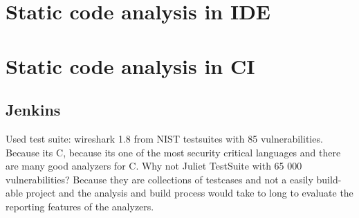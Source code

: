 \documentclass[conference]{IEEEtran}
\begin{document}
\section{Static code analysis in IDE}
\label{sec:static_code_analysis_ide}




\section{Static code analysis in CI}
\label{sec:static_code_analysis_ci}

\subsection{Jenkins}
\label{subsec:jenkins}
Used test suite: wireshark 1.8 from NIST testsuites with 85 vulnerabilities.
Because its C, because its one of the most security critical languages and there are many good analyzers for C.
Why not Juliet TestSuite with 65 000 vulnerabilities?
Because they are collections of testcases and not a easily build-able project and the analysis and build process would take to long to evaluate the reporting features of the analyzers.

\end{document}

